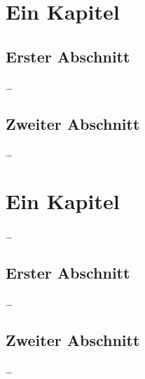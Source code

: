 \chapter{Ein Kapitel}
\label{ch:Content1}


\section{Erster Abschnitt}
\label{ch:Content1:sec:Section1}

\dots


\section{Zweiter Abschnitt}
\label{ch:Content1:sec:Section2}

\dots



\chapter{Ein Kapitel}
\label{ch:Content2}

\dots


\section{Erster Abschnitt}
\label{ch:Content2:sec:Section1}

\dots


\section{Zweiter Abschnitt}
\label{ch:Content2:sec:Section2}

\dots

